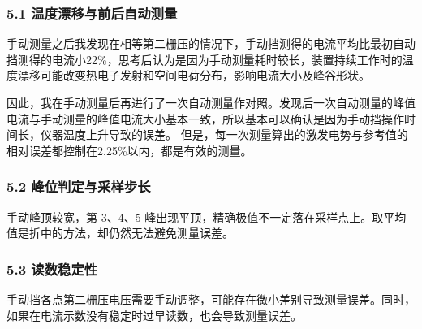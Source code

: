 \subsubsection*{5.1 温度漂移与前后自动测量}

手动测量之后我发现在相等第二栅压的情况下，手动挡测得的电流平均比最初自动挡测得的电流小22\%，思考后认为是因为手动测量耗时较长，装置持续工作时的温度漂移可能改变热电子发射和空间电荷分布，影响电流大小及峰谷形状。

因此，我在手动测量后再进行了一次自动测量作对照。发现后一次自动测量的峰值电流与手动测量的峰值电流大小基本一致，所以基本可以确认是因为手动挡操作时间长，仪器温度上升导致的误差。
但是，每一次测量算出的激发电势与参考值的相对误差都控制在2.25\%以内，都是有效的测量。

\subsubsection*{5.2 峰位判定与采样步长}

手动峰顶较宽，第 3、4、5 峰出现平顶，精确极值不一定落在采样点上。取平均值是折中的方法，却仍然无法避免测量误差。

\subsubsection*{5.3 读数稳定性}

手动挡各点第二栅压电压需要手动调整，可能存在微小差别导致测量误差。同时，如果在电流示数没有稳定时过早读数，也会导致测量误差。
